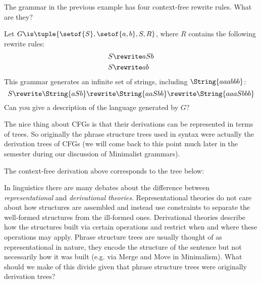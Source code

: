 \begin{homework}
    The grammar in the previous example has four context-free rewrite rules.
    What are they?
\end{homework}

\begin{examplebox}
    Let $G \is \tuple{
            \setof{S},
            \setof{a,b},
            S,
            R}$,
    where $R$ contains the following rewrite rules:
    \begin{align*}
        S &\rewrite aSb\\
        S &\rewrite ab
    \end{align*}
    This grammar generates an infinite set of strings, including $\String{aaabbb}$:
    \[
        S
        \rewrite \String{aSb}
        \rewrite \String{aaSbb}
        \rewrite \String{aaaSbbb}
    \]
    Can you give a description of the language generated by $G$?
\end{examplebox}

The nice thing about CFGs is that their derivations can be represented in terms of trees.
So originally the phrase structure trees used in syntax were actually the derivation trees of CFGs (we will come back to this point much later in the semester during our discussion of Minimalist grammars).
%
\begin{examplebox}
    The context-free derivation above corresponds to the tree below:
    \begin{center}
    \end{center}
\end{examplebox}
%
\begin{homework}
    In linguistics there are many debates about the difference between \emph{representational} and \emph{derivational theories}.
    Representational theories do not care about how structures are assembled and instead use constraints to separate the well-formed structures from the ill-formed ones.
    Derivational theories describe how the structures built via certain operations and restrict when and where these operations may apply.
    Phrase structure trees are usually thought of as representational in nature, they encode the structure of the sentence but not necessarily how it was built (e.g. via Merge and Move in Minimalism).
    What should we make of this divide given that phrase structure trees were originally derivation trees?
\end{homework}


